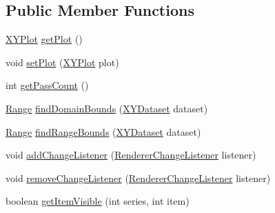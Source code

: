 \subsection*{Public Member Functions}
\begin{DoxyCompactItemize}
\item 
\mbox{\hyperlink{classorg_1_1jfree_1_1chart_1_1plot_1_1_x_y_plot}{X\+Y\+Plot}} \mbox{\hyperlink{interfaceorg_1_1jfree_1_1chart_1_1renderer_1_1xy_1_1_x_y_item_renderer_a28894e1e08c481201d49e6e87dde6568}{get\+Plot}} ()
\item 
void \mbox{\hyperlink{interfaceorg_1_1jfree_1_1chart_1_1renderer_1_1xy_1_1_x_y_item_renderer_a731979b292728dcb13c9041df3f713f5}{set\+Plot}} (\mbox{\hyperlink{classorg_1_1jfree_1_1chart_1_1plot_1_1_x_y_plot}{X\+Y\+Plot}} plot)
\item 
int \mbox{\hyperlink{interfaceorg_1_1jfree_1_1chart_1_1renderer_1_1xy_1_1_x_y_item_renderer_afe42489776da2a4c7e64838382bbaea1}{get\+Pass\+Count}} ()
\item 
\mbox{\hyperlink{classorg_1_1jfree_1_1data_1_1_range}{Range}} \mbox{\hyperlink{interfaceorg_1_1jfree_1_1chart_1_1renderer_1_1xy_1_1_x_y_item_renderer_a77925018c73214f58daac73147ba5e52}{find\+Domain\+Bounds}} (\mbox{\hyperlink{interfaceorg_1_1jfree_1_1data_1_1xy_1_1_x_y_dataset}{X\+Y\+Dataset}} dataset)
\item 
\mbox{\hyperlink{classorg_1_1jfree_1_1data_1_1_range}{Range}} \mbox{\hyperlink{interfaceorg_1_1jfree_1_1chart_1_1renderer_1_1xy_1_1_x_y_item_renderer_af9ac6f440e99c73d343de7851e89496a}{find\+Range\+Bounds}} (\mbox{\hyperlink{interfaceorg_1_1jfree_1_1data_1_1xy_1_1_x_y_dataset}{X\+Y\+Dataset}} dataset)
\item 
void \mbox{\hyperlink{interfaceorg_1_1jfree_1_1chart_1_1renderer_1_1xy_1_1_x_y_item_renderer_aa4a7632bcaa644d55cc0c85fc754f0ca}{add\+Change\+Listener}} (\mbox{\hyperlink{interfaceorg_1_1jfree_1_1chart_1_1event_1_1_renderer_change_listener}{Renderer\+Change\+Listener}} listener)
\item 
void \mbox{\hyperlink{interfaceorg_1_1jfree_1_1chart_1_1renderer_1_1xy_1_1_x_y_item_renderer_a1cbda675f267deb2d47b502d5683e869}{remove\+Change\+Listener}} (\mbox{\hyperlink{interfaceorg_1_1jfree_1_1chart_1_1event_1_1_renderer_change_listener}{Renderer\+Change\+Listener}} listener)
\item 
boolean \mbox{\hyperlink{interfaceorg_1_1jfree_1_1chart_1_1renderer_1_1xy_1_1_x_y_item_renderer_acb9d59e5db4ea6603bf83d5035170720}{get\+Item\+Visible}} (int series, int item)
\item 

\end{DoxyCompactItemize}
